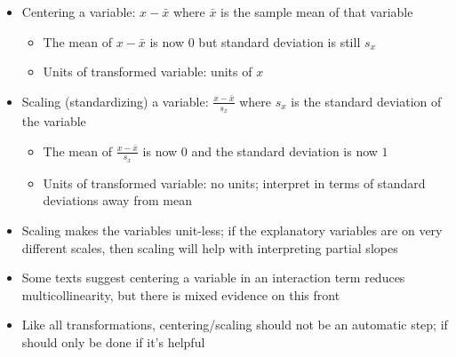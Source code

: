 \documentclass[12pt]{article}
\begin{document}
\begin{itemize}
\begin{itemize}
\item Centering a variable: $x - \bar{x}$ where $\bar{x}$ is the sample mean of that variable \begin{itemize} 
\item The mean of $x - \bar{x}$ is now $0$ but standard deviation is still $s_x$ 
\item Units of transformed variable: units of $x$ \end{itemize} 
\item Scaling (standardizing) a variable: $\frac{x - \bar{x}}{s_x}$ where $s_x$ is the standard deviation of the variable \begin{itemize} 
\item The mean of $\frac{x - \bar{x}}{s_x}$ is now $0$ and the standard deviation is now $1$ 
\item Units of transformed variable: no units; interpret in terms of standard deviations away from mean \end{itemize} 
\item Scaling makes the variables unit-less; if the explanatory variables are on very different scales, then scaling will help with interpreting partial slopes 
\item Some texts suggest centering a variable in an interaction term reduces multicollinearity, but there is mixed evidence on this front 
\item Like all transformations, centering/scaling should not be an automatic step; if should only be done if it's helpful \end{itemize} 
\end{itemize}
\end{document}
